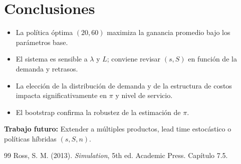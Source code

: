 \documentclass[12pt,a4paper]{article}
\begin{document}
\section{Conclusiones}
\begin{itemize}
  \item La política óptima $(20,60)$ maximiza la ganancia promedio bajo los parámetros base.
  \item El sistema es sensible a $\lambda$ y $L$; conviene revisar $(s,S)$ en función de la demanda y retrasos.
  \item La elección de la distribución de demanda y de la estructura de costos impacta significativamente en $\pi$ y nivel de servicio.
  \item El bootstrap confirma la robustez de la estimación de $\pi$.
\end{itemize}
\noindent\textbf{Trabajo futuro:} Extender a múltiples productos, lead time estocástico o políticas híbridas $(s,S,n)$.

\begin{thebibliography}{99}
 Ross, S. M. (2013). \textit{Simulation}, 5th ed. Academic Press. Capítulo 7.5.
\end{thebibliography}
\end{document}
